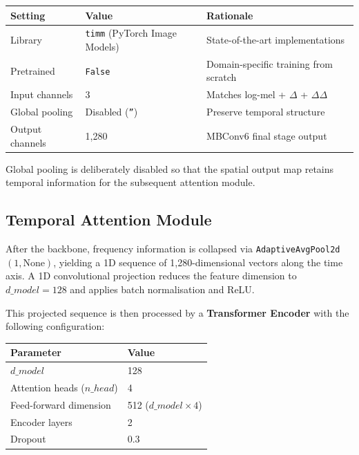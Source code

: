 \documentclass[12pt,a4paper]{article}
\begin{document}
\begin{center}
\renewcommand{\arraystretch}{1.3}
\begin{tabular}{lll}
  \toprule
  \textbf{Setting} & \textbf{Value} & \textbf{Rationale} \\
  \midrule
  Library          & \texttt{timm} (PyTorch Image Models) & State-of-the-art implementations \\
  Pretrained       & \texttt{False} & Domain-specific training from scratch \\
  Input channels   & 3 & Matches log-mel + $\Delta$ + $\Delta\Delta$ \\
  Global pooling   & Disabled (\texttt{''}) & Preserve temporal structure \\
  Output channels  & 1{,}280 & MBConv6 final stage output \\
  \bottomrule
\end{tabular}
\end{center}

Global pooling is deliberately disabled so that the spatial output map retains temporal information for the subsequent attention module.

\subsection{Temporal Attention Module}

After the backbone, frequency information is collapsed via \texttt{AdaptiveAvgPool2d}~$(1, \text{None})$, yielding a 1D sequence of 1{,}280-dimensional vectors along the time axis. A 1D convolutional projection reduces the feature dimension to $d\_model = 128$ and applies batch normalisation and ReLU.

This projected sequence is then processed by a \textbf{Transformer Encoder} with the following configuration:

\begin{center}
\renewcommand{\arraystretch}{1.3}
\begin{tabular}{ll}
  \toprule
  \textbf{Parameter} & \textbf{Value} \\
  \midrule
  $d\_model$         & 128 \\
  Attention heads ($n\_head$) & 4 \\
  Feed-forward dimension & 512 ($d\_model \times 4$) \\
  Encoder layers   & 2 \\
  Dropout          & 0.3 \\
  \bottomrule
\end{tabular}
\end{center}
\end{document}
